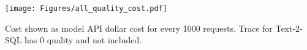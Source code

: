 {
\begin{figure*}[t!]
\hfill
\begin{minipage}{\textwidth}
\begin{center}
\centerline{\texttt{[image: Figures/all\_quality\_cost.pdf]}}
\end{center}
\end{minipage}
\hfill
\vspace{-0.3in}
{
Cost shown as model API dollar cost for every 1000 requests.
Trace for Text-2-SQL has 0 quality and not included.
}
\vspace{0.1in}
\end{figure*}
}
